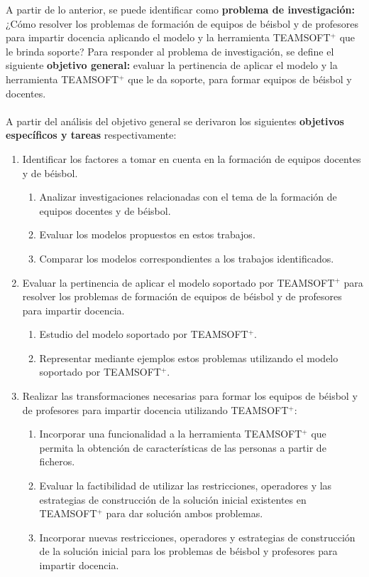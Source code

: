 A partir de lo anterior, se puede identificar como \textbf{problema de investigación:} ¿Cómo resolver los problemas de formación de equipos de béisbol y de profesores para impartir docencia aplicando el modelo y la herramienta TEAMSOFT$^+$ que le brinda soporte? Para responder al problema de investigación, se define el siguiente \textbf{objetivo general:} evaluar la pertinencia de aplicar el modelo y la herramienta TEAMSOFT$^+$ que le da soporte, para formar equipos de béisbol y docentes.\\\\
A partir del análisis del objetivo general se derivaron los siguientes \textbf{objetivos específicos y tareas} respectivamente:
\begin{enumerate}		
	\item Identificar los factores a tomar en cuenta en la formación de equipos docentes y de béisbol.
		\begin{enumerate}
			\item Analizar investigaciones relacionadas con el tema de la formación de equipos docentes y de béisbol.
			\item Evaluar los modelos propuestos en estos trabajos.
			\item Comparar los modelos correspondientes a los trabajos identificados.
		\end{enumerate}
	
	\item Evaluar la pertinencia de aplicar el modelo soportado por TEAMSOFT$^+$ para resolver los problemas de formación de equipos de béisbol y de profesores para impartir docencia.
		\begin{enumerate}
			\item Estudio del modelo soportado por TEAMSOFT$^+$.
			\item Representar mediante ejemplos estos problemas utilizando el modelo soportado por TEAMSOFT$^+$.
		\end{enumerate}

\color{red}		
	\item Realizar las transformaciones necesarias para formar los equipos de béisbol y de profesores para impartir docencia utilizando TEAMSOFT$^+$:
		\begin{enumerate}
			\item Incorporar una funcionalidad a la herramienta TEAMSOFT$^+$ que permita la obtención de características de las personas a partir de ficheros.
			\item Evaluar la factibilidad de utilizar las restricciones, operadores y las estrategias de construcción de la solución inicial existentes en TEAMSOFT$^+$ para dar solución ambos problemas.
			\item Incorporar nuevas restricciones, operadores y estrategias de construcción de la solución inicial para los problemas de béisbol y profesores para impartir docencia. 
		\end{enumerate}
\end{enumerate}

